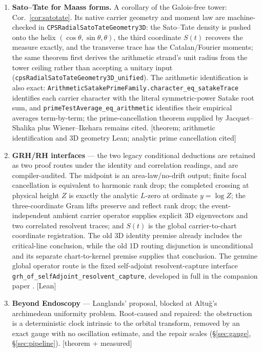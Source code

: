 \documentclass[11pt]{article}
\theoremstyle{definition}
\begin{document}
\begin{enumerate}
step Lean]
\item \textbf{Sato--Tate for Maass forms.} A corollary of the Galois-free tower:
Cor.~\ref{cor:satotate}. Its native carrier geometry and moment law are
machine-checked in \texttt{CPSRadialSatoTateGeometry3D}: the Sato--Tate density is pushed onto
the helix $(\cos\theta,\sin\theta,\theta)$, the third coordinate $S(t)$ recovers the measure
exactly, and the transverse trace has the Catalan/Fourier moments; the same theorem first derives
the arithmetic strand's unit radius from the tower ceiling rather than accepting a unitary input
(\texttt{cpsRadialSatoTateGeometry3D\_unified}).  The arithmetic identification is also exact:
\texttt{ArithmeticSatakePrimeFamily.character\_eq\_satakeTrace} identifies each carrier
character with the literal symmetric-power Satake root sum, and
\texttt{primeTestAverage\_eq\_arithmetic} identifies their empirical averages term-by-term; the
prime-cancellation theorem supplied by Jacquet--Shalika plus Wiener--Ikehara remains cited.
[theorem; arithmetic identification and 3D geometry Lean; analytic prime cancellation cited]
\item \textbf{GRH/RH interfaces} --- the two legacy conditional deductions
are retained as two proof routes under the identity and correlation readings,
and are compiler-audited.  The midpoint is an area-law/no-drift
output; finite focal cancellation is equivalent to harmonic rank drop; the
completed crossing at physical height \(Z\) is exactly the analytic
\(L\)-zero at ordinate \(y=\log Z\); the three-coordinate Gram lifts preserve
and reflect rank drop; the event-independent ambient carrier operator supplies explicit
3D eigenvectors and two correlated resolvent traces; and \(S(t)\) is the global carrier-to-chart coordinate
registration.  The old 3D
identity premise already includes the critical-line conclusion, while the old
1D routing disjunction is unconditional and its separate chart-to-kernel
premise supplies that conclusion.  The genuine global operator route is the
fixed self-adjoint resolvent-capture interface
\texttt{grh\_of\_selfAdjoint\_resolvent\_capture}, developed in full in the
companion paper \cite{GRHCompanion}. [Lean]
\item \textbf{Beyond Endoscopy} --- Langlands' proposal, blocked at Altu\u{g}'s archimedean
uniformity problem. Root-caused and repaired: the obstruction is a deterministic clock intrinsic
to the orbital transform, removed by an exact gauge with no oscillation estimate, and the repair
scales (\S\ref{sec:gauge}, \S\ref{sec:pipeline}). [theorem + measured]

\end{enumerate}
\end{document}
